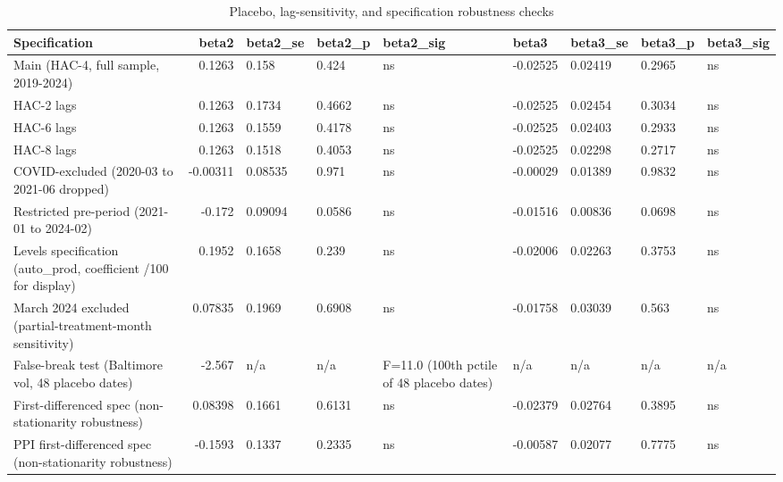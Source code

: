 \begin{table}
\caption{Placebo, lag-sensitivity, and specification robustness checks}
\label{tab:tableS1_robustness}
\begin{tabular}{lrlllllll}
\toprule
Specification & beta2 & beta2\_se & beta2\_p & beta2\_sig & beta3 & beta3\_se & beta3\_p & beta3\_sig \\
\midrule
Main (HAC-4, full sample, 2019-2024) & 0.1263 & 0.158 & 0.424 & ns & -0.02525 & 0.02419 & 0.2965 & ns \\
HAC-2 lags & 0.1263 & 0.1734 & 0.4662 & ns & -0.02525 & 0.02454 & 0.3034 & ns \\
HAC-6 lags & 0.1263 & 0.1559 & 0.4178 & ns & -0.02525 & 0.02403 & 0.2933 & ns \\
HAC-8 lags & 0.1263 & 0.1518 & 0.4053 & ns & -0.02525 & 0.02298 & 0.2717 & ns \\
COVID-excluded (2020-03 to 2021-06 dropped) & -0.00311 & 0.08535 & 0.971 & ns & -0.00029 & 0.01389 & 0.9832 & ns \\
Restricted pre-period (2021-01 to 2024-02) & -0.172 & 0.09094 & 0.0586 & ns & -0.01516 & 0.00836 & 0.0698 & ns \\
Levels specification (auto\_prod, coefficient /100 for display) & 0.1952 & 0.1658 & 0.239 & ns & -0.02006 & 0.02263 & 0.3753 & ns \\
March 2024 excluded (partial-treatment-month sensitivity) & 0.07835 & 0.1969 & 0.6908 & ns & -0.01758 & 0.03039 & 0.563 & ns \\
False-break test (Baltimore vol, 48 placebo dates) & -2.567 & n/a & n/a & F=11.0 (100th pctile of 48 placebo dates) & n/a & n/a & n/a & n/a \\
First-differenced spec (non-stationarity robustness) & 0.08398 & 0.1661 & 0.6131 & ns & -0.02379 & 0.02764 & 0.3895 & ns \\
PPI first-differenced spec (non-stationarity robustness) & -0.1593 & 0.1337 & 0.2335 & ns & -0.00587 & 0.02077 & 0.7775 & ns \\
\bottomrule
\end{tabular}
\end{table}
